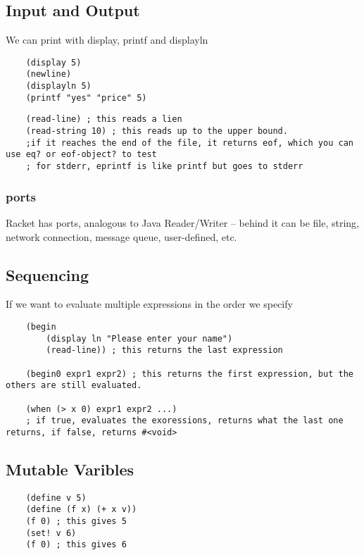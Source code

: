 \documentclass[12pt]{article}
\begin{document}
\subsection{Input and Output}

We can print with display, printf and displayln

\begin{lstlisting}
	(display 5)
	(newline)
	(displayln 5)
	(printf "yes" "price" 5)
\end{lstlisting}

\begin{lstlisting}
	(read-line) ; this reads a lien
	(read-string 10) ; this reads up to the upper bound.
	;if it reaches the end of the file, it returns eof, which you can use eq? or eof-object? to test
	; for stderr, eprintf is like printf but goes to stderr
\end{lstlisting}

\subsubsection{ports}

Racket has ports, analogous to Java Reader/Writer -- behind it can be file, string, network connection, message queue, user-defined, etc.

\subsection{Sequencing}

If we want to evaluate multiple expressions in the order we specify

\begin{lstlisting}
	(begin
		(display ln "Please enter your name")
		(read-line)) ; this returns the last expression
		
	(begin0 expr1 expr2) ; this returns the first expression, but the others are still evaluated.
	
	(when (> x 0) expr1 expr2 ...)
	; if true, evaluates the exoressions, returns what the last one returns, if false, returns #<void>
\end{lstlisting}

\subsection{Mutable Varibles}

\begin{lstlisting}
	(define v 5)
	(define (f x) (+ x v))
	(f 0) ; this gives 5
	(set! v 6)
	(f 0) ; this gives 6
\end{lstlisting}
\end{document}
